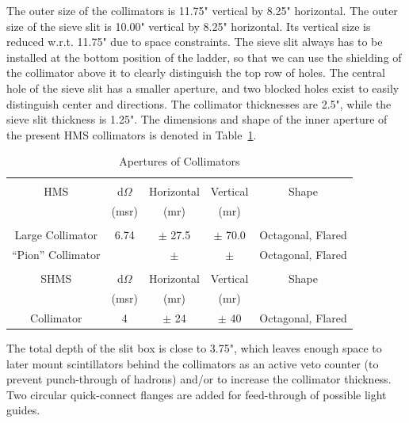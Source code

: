 {The outer size of the collimators is 11.75" vertical by 8.25"
horizontal. The outer size of the sieve slit is 10.00" vertical
by 8.25" horizontal.
Its vertical size is reduced w.r.t. 11.75" due to space constraints.
The sieve slit always has to be installed at the bottom position of the ladder,
so that we can use the shielding of the collimator above it to
clearly distinguish the top row of holes. The central hole
of the sieve slit has a smaller aperture, and two blocked holes
exist to easily distinguish center and directions.
The collimator thicknesses are 2.5", while the sieve slit thickness
is 1.25". The dimensions and shape of the inner aperture of the present
HMS collimators is denoted in Table~\ref{tab:apertures}.

\begin{table}
\begin{center}
\caption{Apertures of Collimators\label{tab:apertures}}
\begin{tabular}{|c|c|c|c|c|}
\hline
{} & {} & {} & {} & {} \\
HMS & d$\Omega$ & Horizontal & Vertical & Shape \\
{}  & (msr) 	& (mr) 	     & (mr) 	& {} 	\\
{} & {} & {} & {} & {} \\ \hline
Large Collimator  & 6.74 & $\pm$ 27.5 	& $\pm$ 70.0 	& Octagonal, Flared 	\\
``Pion'' Collimator&  	& $\pm$	& $\pm$  	& Octagonal, Flared 	\\
{} & {} & {} & {} & {} \\ \hline
SHMS	& d$\Omega$ 	& Horizontal 	& Vertical 		& Shape 	\\
{} 	& (msr) 	& (mr) 		& (mr) 		& {} 	\\
Collimator &   4         & $\pm$ 24      &  $\pm$ 40     & Octagonal, Flared \\
\hline
\end{tabular}
\end{center}
\end{table}

The total depth of the slit box is close to 3.75", which leaves
enough space to later mount scintillators behind the collimators as an active
veto counter (to prevent punch-through of hadrons) and/or to increase
the collimator thickness. Two circular quick-connect flanges are
added for feed-through of possible light guides.

}
